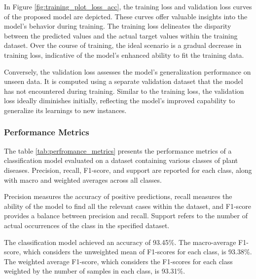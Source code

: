 \documentclass{article}
\begin{document}
In Figure \ref{fig:training_plot_loss_acc}, the training loss and validation loss curves of the proposed model are depicted. These curves offer valuable insights into the model's behavior during training. The training loss delineates the disparity between the predicted values and the actual target values within the training dataset. Over the course of training, the ideal scenario is a gradual decrease in training loss, indicative of the model's enhanced ability to fit the training data.

Conversely, the validation loss assesses the model's generalization performance on unseen data. It is computed using a separate validation dataset that the model has not encountered during training. Similar to the training loss, the validation loss ideally diminishes initially, reflecting the model's improved capability to generalize its learnings to new instances.



\subsubsection{Performance Metrics}

The table \ref{tab:perfromance_metrics} presents the performance metrics of a classification model evaluated on a dataset containing various classes of plant diseases. Precision, recall, F1-score, and support are reported for each class, along with macro and weighted averages across all classes.

Precision measures the accuracy of positive predictions, recall measures the ability of the model to find all the relevant cases within the dataset, and F1-score provides a balance between precision and recall. Support refers to the number of actual occurrences of the class in the specified dataset.

The classification model achieved an accuracy of 93.45\%. The macro-average F1-score, which considers the unweighted mean of F1-scores for each class, is 93.38\%. The weighted average F1-score, which considers the F1-scores for each class weighted by the number of samples in each class, is 93.31\%.
\end{document}
